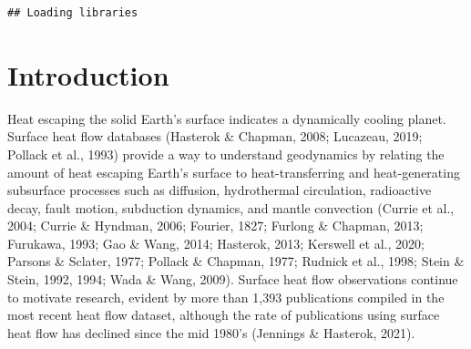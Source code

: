 \documentclass[draft,linenumbers]{agujournal2018}
\begin{document}



\begin{keypoints}
\item 
\item 
\item 
\end{keypoints}

%
%


\begin{abstract}

\end{abstract}
\begin{verbatim}
## Loading libraries
\end{verbatim}

\section{Introduction}

Heat escaping the solid Earth's surface indicates a dynamically cooling
planet. Surface heat flow databases (Hasterok \& Chapman, 2008;
Lucazeau, 2019; Pollack et al., 1993) provide a way to understand
geodynamics by relating the amount of heat escaping Earth's surface to
heat-transferring and heat-generating subsurface processes such as
diffusion, hydrothermal circulation, radioactive decay, fault motion,
subduction dynamics, and mantle convection (Currie et al., 2004; Currie
\& Hyndman, 2006; Fourier, 1827; Furlong \& Chapman, 2013; Furukawa,
1993; Gao \& Wang, 2014; Hasterok, 2013; Kerswell et al., 2020; Parsons
\& Sclater, 1977; Pollack \& Chapman, 1977; Rudnick et al., 1998; Stein
\& Stein, 1992, 1994; Wada \& Wang, 2009). Surface heat flow
observations continue to motivate research, evident by more than 1,393
publications compiled in the most recent heat flow dataset, although the
rate of publications using surface heat flow has declined since the mid
1980's (Jennings \& Hasterok, 2021).
\end{document}
